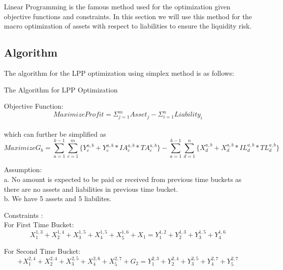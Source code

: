 Linear Programming is the famous method used for the optimization given objective functions and constraints. In this section we will use this method for the macro optimization of assets with respect to liabilities to ensure the liquidity risk. 


\subsection{Algorithm}
The algorithm for the LPP optimization using simplex method is as follows:


\begin{algorithm}[H]

\caption{The Algorithm for LPP Optimization}

\begin{algorithmic}[1] 
						
\STATE Objective Function: \begin{equation}Maximize  Profit =  \Sigma_{j=1}^{m} Asset_{j} -  \Sigma_{i=1}^{n} Liability_{i}\end{equation}\\
		which can further be simplified as\\
		\begin{equation}Maximize  G_{b} =  \sum_{a=1}^{k-1} \sum_{c=1}^{m} \{ Y_{c}^{a,b} + Y_{c}^{a,b} * IA_{c}^{a,b} * TA_{c}^{a,b} \} -  \sum_{a=1}^{k-1} \sum_{d=1}^{n} \{ X_{d}^{a,b} + X_{d}^{a,b} * IL_{d}^{a,b} * TL_{d}^{a,b}\} \end{equation}

\STATE Assumption: \\a. No amount is expected to be paid or received from previous time buckets as there are no assets and liabilities in previous time bucket.\\
b. We have 5 assets and 5 liabilites.
	
\STATE Constraints : \\

For First Time Bucket: 
\begin{equation} X_{1}^{1,3} + X_{2}^{1,4} + X_{3}^{1,5} +X_{4}^{1,5} + X_{5}^{1,6} + X_{1}= Y_{1}^{1,2} + Y_{2}^{1,3} +Y_{3}^{1,5} + Y_{4}^{1,6}\end{equation}

For Second Time Bucket:
\begin{equation}
[Y_{1}^{1,2} + Y_{1}^{1,2}* IA_{1}^{1,2} * TA_{1}^{1,2}] +  X_{1}^{2,4} + X_{2}^{2,4} + X_{3}^{2,5} + X_{4}^{2,6} + X_{5}^{2,7} + G_{2} = Y_{1}^{2,3} + Y_{2}^{2,4} +  Y_{3}^{2,5} +  Y_{4}^{2,7} +  Y_{5}^{2,7} 
\end{equation}


\end{algorithmic}
\end{algorithm}
